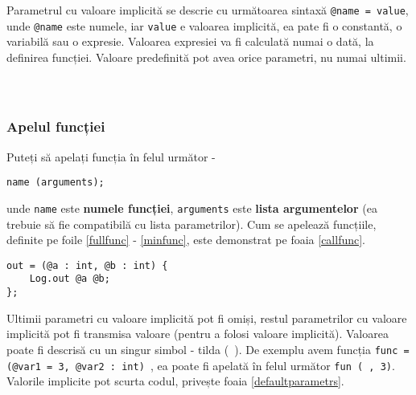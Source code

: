 Parametrul cu valoare implicită se descrie cu următoarea sintaxă \texttt{@name = value}, unde \texttt{@name} este numele, iar \texttt{value} e valoarea implicită, ea pate fi o constantă, o variabilă sau o expresie. Valoarea expresiei va fi calculată numai o dată, la definirea funcției. Valoare predefinită pot avea orice parametri, nu numai ultimii.

\begin{sourcecode}
\label{fullfunc}
\inputminted[linenos]{icl}{../sources/fullfunc.icL}
\end{sourcecode}

\begin{sourcecode}
\label{noargsfunc}
\inputminted[linenos]{icl}{../sources/noargsfunc.icL}
\end{sourcecode}

\begin{sourcecode}
\label{notypefunc}
\inputminted[linenos]{icl}{../sources/notypefunc.icL}
\end{sourcecode}

\subsubsection{Apelul funcției}

Puteți să apelați funcția în felul următor -
\begin{verbatim}
name (arguments);
\end{verbatim}
unde \texttt{name} este {\bf numele funcției}, \texttt{arguments} este {\bf lista argumentelor} (ea trebuie să fie compatibilă cu lista parametrilor). Cum se apelează funcțiile, definite pe foile \ref{fullfunc} - \ref{minfunc}, este demonstrat pe foaia \ref{callfunc}.

\begin{sourcecode}
\label{minfunc}
\begin{verbatim}
out = (@a : int, @b : int) {
	Log.out @a @b;
};
\end{verbatim}
\end{sourcecode}

Ultimii parametri cu valoare implicită pot fi omiși, restul parametrilor cu valoare implicită pot fi transmisa valoare \void{} (pentru a folosi valoare implicită). Valoarea \void{} poate fi descrisă cu un singur simbol - tilda (\texttt{~}). De exemplu avem funcția \texttt{func = (@var1 = 3, @var2 : int) {}}, ea poate fi apelată în felul următor \texttt{fun (~, 3)}. Valorile implicite pot scurta codul, privește foaia \ref{defaultparametrs}.

